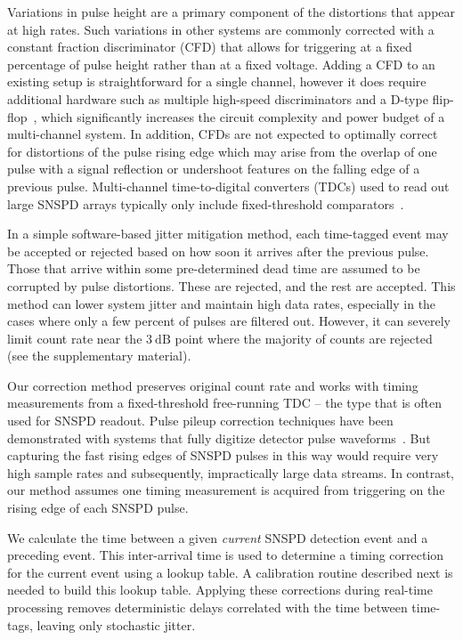 \documentclass[11pt]{caltech_thesis} %
\begin{document}
Variations in pulse height are a primary component of the distortions
that appear at high rates. Such variations in other systems are commonly
corrected with a constant fraction discriminator (CFD) that allows for
triggering at a fixed percentage of pulse height rather than at a fixed
voltage. Adding a CFD to an existing setup is straightforward for a
single channel, however it does require additional hardware such as
multiple high-speed discriminators and a D-type
flip-flop~\autocite{Becker2005}, which significantly
increases the circuit complexity and power budget of a multi-channel
system. In addition, CFDs are not expected to optimally correct for
distortions of the pulse rising edge which may arise from the overlap of
one pulse with a signal reflection or undershoot features on the falling
edge of a previous pulse. Multi-channel time-to-digital converters
(TDCs) used to read out large SNSPD arrays typically only include
fixed-threshold comparators~\autocite{Wollman2019}.

In a simple software-based jitter mitigation method, each time-tagged
event may be accepted or rejected based on how soon it arrives after the
previous pulse. Those that arrive within some pre-determined dead time
are assumed to be corrupted by pulse distortions. These are rejected,
and the rest are accepted. This method can lower system jitter and
maintain high data rates, especially in the cases where only a few
percent of pulses are filtered out. However, it can severely limit count
rate near the $3~\mathrm{dB}$ point where the majority of counts are
rejected (see the supplementary material).

Our correction method preserves original count rate and works with
timing measurements from a fixed-threshold free-running TDC -- the type
that is often used for SNSPD readout. Pulse pileup correction techniques
have been demonstrated with systems that fully digitize detector pulse
waveforms~\autocite{Behbahani2019,scoullar_evans_2009,Haselman2010}.
But capturing the fast rising edges of SNSPD pulses in this way would
require very high sample rates and subsequently, impractically large
data streams. In contrast, our method assumes one timing measurement is
acquired from triggering on the rising edge of each SNSPD pulse.

We calculate the time between a given \emph{current} SNSPD detection
event and a preceding event. This inter-arrival time is used to
determine a timing correction for the current event using a lookup
table. A calibration routine described next is needed to build this
lookup table. Applying these corrections during real-time processing
removes deterministic delays correlated with the time between time-tags,
leaving only stochastic jitter.
\end{document}
